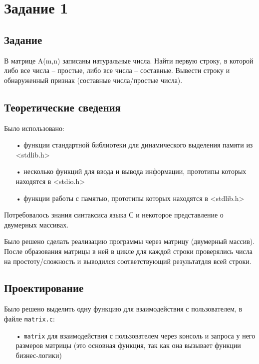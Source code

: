 \documentclass[12pt,a4paper]{report}
\begin{document}
\section{Задание 1}

\subsection{Задание}

 В матрице A(m,n) записаны натуральные числа. Найти первую строку, в которой либо все числа – простые, либо все числа – составные. Вывести строку и обнаруженный признак (составные числа/простые числа).

\subsection{Теоретические сведения}

Было использовано:
\begin{enumerate}
\item[•] функции стандартной библиотеки для динамического выделения памяти из <stdlib.h>
\item[•] несколько функций для ввода и вывода информации, прототипы которых находятся в <stdio.h>
\item[•] функции работы с памятью, прототипы которых находятся в <stdlib.h>
\end{enumerate}

Потребовалось знания синтаксиса языка С и некоторое представление о двумерных массивах.

Было решено сделать реализацию программы через матрицу (двумерный массив). После образования матрицы в ней в цикле для каждой строки проверялись числа на простоту/сложность и выводился соответствующий результатдля всей строки.

\subsection{Проектирование}

Было решено выделить одну функцию для взаимодействия с пользователем, в файле \verb-matrix.c-:
\begin{enumerate}
\item[•] \verb-matrix- для взаимодействия с пользователем через консоль и запроса у него размеров матрицы (это основная функция, так как она вызывает функции бизнес-логики)
\end{enumerate}
\end{document}
